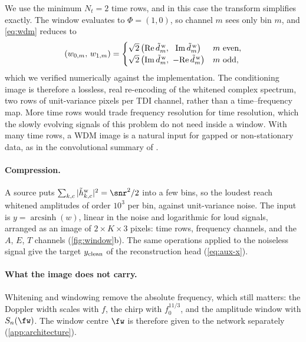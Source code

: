 We use the minimum $N_t = 2$ time rows, and in this case the transform simplifies exactly. The
window evaluates to $\Phi = (1, 0)$, so channel $m$ sees only bin $m$, and \cref{eq:wdm}
reduces to
\begin{equation}
  (w_{0,m},\,w_{1,m}) =
  \begin{cases}
    \sqrt2\,\bigl(\mathrm{Re}\,\tilde d^{\,\rm w}_m,\ \ \mathrm{Im}\,\tilde d^{\,\rm w}_m\bigr) & m\ \text{even},\\
    \sqrt2\,\bigl(\mathrm{Im}\,\tilde d^{\,\rm w}_m,\ -\mathrm{Re}\,\tilde d^{\,\rm w}_m\bigr) & m\ \text{odd},
  \end{cases}
  \label{eq:wdm-nt2}
\end{equation}
which we verified numerically against the implementation. The conditioning image is therefore
a lossless, real re-encoding of the whitened complex spectrum, two rows of unit-variance
pixels per TDI channel, rather than a time--frequency map. More time rows would trade
frequency resolution for time resolution, which the slowly evolving signals of this problem
do not need inside a window. With many time rows, a WDM image is a natural input for gapped
or non-stationary data, as in the convolutional summary of \citet{mao2025robust}.

\paragraph{Compression.}
A source puts $\sum_{k,c}|\tilde h^{\rm w}_{k,c}|^2 = \snr^2/2$ into a few bins, so the loudest
reach whitened amplitudes of order $10^3$ per bin, against unit-variance noise.
The input is $y = \operatorname{arcsinh}(w)$, linear in the noise and logarithmic for loud
signals, arranged as an image of $2\times K\times3$ pixels: time rows, frequency channels, and
the $A$, $E$, $T$ channels (\cref{fig:window}b). The same operations applied to the noiseless
signal give the target $y_{\rm clean}$ of the reconstruction head (\cref{eq:aux-x}).

\paragraph{What the image does not carry.}
Whitening and windowing remove the absolute frequency, which still matters: the Doppler width
scales with $f$, the chirp with $f_0^{11/3}$, and the amplitude window with $S_n(\fw)$. The
window centre $\fw$ is therefore given to the network separately (\cref{app:architecture}).

